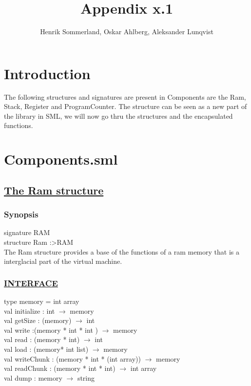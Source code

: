 \documentclass[a4paper]{article}
\title{Appendix x.1}
\author{Henrik Sommerland, Oskar Ahlberg, Aleksander Lunqvist}
\begin{document}
\maketitle


\tableofcontents
\newpage
\section{Introduction}

The following structures and signatures are present in Components are the Ram, Stack, Register and ProgramCounter.
The structure can be seen as a new part of the library in SML, we will now go thru the structures and the encapsulated functions.

\section{Components.sml}

\subsection{\uline{The Ram structure}}
\subsubsection{Synopsis}
signature RAM\\
structure Ram :\textgreater RAM\\

The Ram structure provides a base of the functions of a ram memory that is a interglacial part of the virtual machine.

\subsubsection{\uline{INTERFACE}}


    type memory = int array
	\\val initialize : int $\rightarrow$ memory 							
 	\\val getSize : (memory) $\rightarrow$ int 
    \\val write :(memory * int * int ) $\rightarrow$ memory	  				
	\\val read : (memory * int) $\rightarrow$ int							
	\\val load : (memory* int list) $\rightarrow$ memory					
	\\val writeChunk : (memory * int * (int array)) $\rightarrow$ memory
	\\val readChunk : (memory * int * int) $\rightarrow$ int array			
	\\val dump : memory $\rightarrow$ string
    \\
    \\
    \\
\\
\\
\end{document}
